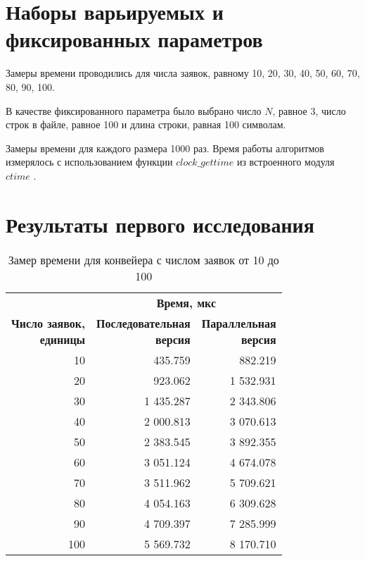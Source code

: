 \section*{Наборы варьируемых и фиксированных параметров}

Замеры времени проводились для числа заявок, равному 10, 20, 30, 40, 50, 60, 70, 80, 90, 100.

В качестве фиксированного параметра было выбрано число $N$, равное 3, число строк в файле, равное 100 и длина строки, равная 100 символам.

\clearpage

Замеры времени для каждого размера 1000 раз. Время работы алгоритмов измерялось с использованием функции $clock\_gettime$ из встроенного модуля $ctime$ \cite{cpu_time_func}.  

\clearpage

\section*{Результаты первого исследования}

\begin{table}[ht]
	\small
	\begin{center}
		\begin{threeparttable}
			\caption{Замер времени для конвейера с числом заявок от 10 до 100}
			\label{tbl:time}
			\begin{tabular}{|r|r|r|}
				\hline
				& \multicolumn{2}{c|}{\bfseries Время, мкс} \\ \cline{2-3}
				\bfseries \makecell{Число заявок, \\ единицы} & \bfseries \makecell{Последовательная \\ версия} & \bfseries \makecell{Параллельная \\ версия} \\ \cline{2-3}
				\hline
				10 & 435.759 & 882.219  \\
				\hline
				20 & 923.062 & 1 532.931 \\
				\hline
				30 & 1 435.287 & 2 343.806  \\
				\hline
				40 & 2 000.813 & 3 070.613 \\
				\hline
				50 & 2 383.545 & 3 892.355  \\
				\hline
				60 & 3 051.124 & 4 674.078  \\
				\hline
				70 & 3 511.962 & 5 709.621  \\
				\hline
				80 & 4 054.163 & 6 309.628  \\
				\hline
				90 & 4 709.397 & 7 285.999  \\
				\hline
				100 & 5 569.732 & 8 170.710  \\
				\hline
			\end{tabular}	
		\end{threeparttable}
	\end{center}
\end{table}

